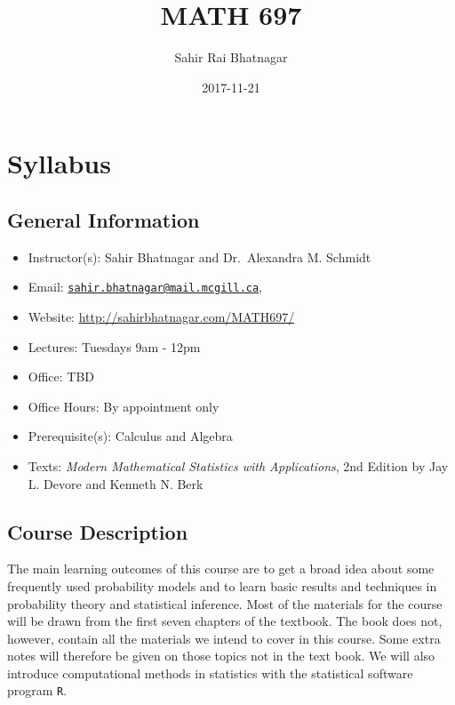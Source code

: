 \documentclass[]{book}
\title{MATH 697}
\author{Sahir Rai Bhatnagar}
\date{2017-11-21}
\providecommand{\tightlist}{%
  \setlength{\itemsep}{0pt}\setlength{\parskip}{0pt}}
\theoremstyle{definition}
\theoremstyle{definition}
\theoremstyle{definition}
\theoremstyle{remark}
\begin{document}
\maketitle

{
\setcounter{tocdepth}{1}
\tableofcontents
}
\chapter*{Syllabus}\label{syllabus}

\section*{General Information}\label{general-information}

\begin{itemize}
\tightlist
\item
  Instructor(s): Sahir Bhatnagar and Dr.~Alexandra M. Schmidt
\item
  Email:
  \href{mailto:sahir.bhatnagar@mail.mcgill.ca}{\nolinkurl{sahir.bhatnagar@mail.mcgill.ca}},
\item
  Website: \url{http://sahirbhatnagar.com/MATH697/}
\item
  Lectures: Tuesdays 9am - 12pm
\item
  Office: TBD
\item
  Office Hours: By appointment only
\item
  Prerequisite(s): Calculus and Algebra
\item
  Texts: \emph{Modern Mathematical Statistics with Applications}, 2nd
  Edition by Jay L. Devore and Kenneth N. Berk
\end{itemize}

\section*{Course Description}\label{course-description}

The main learning outcomes of this course are to get a broad idea about
some frequently used probability models and to learn basic results and
techniques in probability theory and statistical inference. Most of the
materials for the course will be drawn from the first seven chapters of
the textbook. The book does not, however, contain all the materials we
intend to cover in this course. Some extra notes will therefore be given
on those topics not in the text book. We will also introduce
computational methods in statistics with the statistical software
program \texttt{R}.
\end{document}

